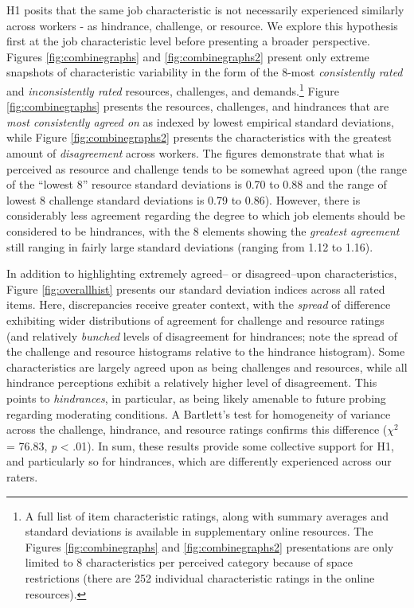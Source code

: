 \documentclass[
  man]{apa7}
\begin{document}
H1 posits that the same job characteristic is not necessarily experienced similarly across workers - as hindrance, challenge, or resource. We explore this hypothesis first at the job characteristic level before presenting a broader perspective. Figures \ref{fig:combinegraphs} and \ref{fig:combinegraphs2} present only extreme snapshots of characteristic variability in the form of the 8-most \emph{consistently rated} and \emph{inconsistently rated} resources, challenges, and demands.\footnote{A full list of item characteristic ratings, along with summary averages and standard deviations is available in supplementary online resources. The Figures \ref{fig:combinegraphs} and \ref{fig:combinegraphs2} presentations are only limited to 8 characteristics per perceived category because of space restrictions (there are 252 individual characteristic ratings in the online resources).} Figure \ref{fig:combinegraphs} presents the resources, challenges, and hindrances that are \emph{most consistently agreed on} as indexed by lowest empirical standard deviations, while Figure \ref{fig:combinegraphs2} presents the characteristics with the greatest amount of \emph{disagreement} across workers. The figures demonstrate that what is perceived as resource and challenge tends to be somewhat agreed upon (the range of the ``lowest 8'' resource standard deviations is 0.70 to 0.88 and the range of lowest 8 challenge standard deviations is 0.79 to 0.86). However, there is considerably less agreement regarding the degree to which job elements should be considered to be hindrances, with the 8 elements showing the \emph{greatest agreement} still ranging in fairly large standard deviations (ranging from 1.12 to 1.16).

In addition to highlighting extremely agreed-- or disagreed--upon characteristics, Figure \ref{fig:overallhist} presents our standard deviation indices across all rated items. Here, discrepancies receive greater context, with the \emph{spread} of difference exhibiting wider distributions of agreement for challenge and resource ratings (and relatively \emph{bunched} levels of disagreement for hindrances; note the spread of the challenge and resource histograms relative to the hindrance histogram). Some characteristics are largely agreed upon as being challenges and resources, while all hindrance perceptions exhibit a relatively higher level of disagreement. This points to \emph{hindrances}, in particular, as being likely amenable to future probing regarding moderating conditions. A Bartlett's test for homogeneity of variance across the challenge, hindrance, and resource ratings confirms this difference (\(\chi^2_{}\) = 76.83, \emph{p} \textless{} .01). In sum, these results provide some collective support for H1, and particularly so for hindrances, which are differently experienced across our raters.
\end{document}
